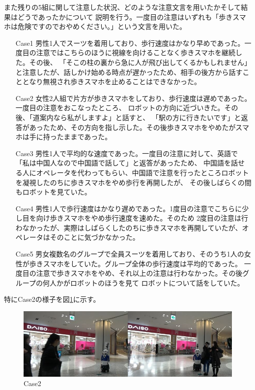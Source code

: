 \documentclass{kuisthesis}
\begin{document}
また残りの5組に関して注意した状況、どのような注意文言を用いたかそして結果はどうであったかについて
説明を行う。一度目の注意はいずれも「歩きスマホは危険ですのでおやめください。」という文言を用いた。
\begin{enumerate}
  \item[Case1] 男性1人でスーツを着用しており、歩行速度はかなり早めであった。一度目の注意ではこちらのほうに視線を向けることなく歩きスマホを継続した。その後、
  「そこの柱の裏から急に人が飛び出してくるかもしれません」
  と注意したが、話しかけ始める時点が遅かったため、相手の後方から話すこととなり無視され歩きスマホを止めることはできなかった。
  \item[Case2] 女性2人組で片方が歩きスマホをしており、歩行速度は遅めであった。一度目の注意をおこなったところ、
  ロボットの方向に近づいきた。その後、「道案内なら私がしますよ」と話すと、
  「駅の方に行きたいです」と返答があったため、その方向を指し示した。その後歩きスマホをやめたがスマホは手に持ったままであった。
  \item[Case3] 男性1人で平均的な速度であった。一度目の注意に対して、英語で「私は中国人なので中国語で話して」と返答があったため、
  中国語を話せる人にオペレータを代わってもらい、中国語で注意を行ったところロボットを凝視したのちに歩きスマホをやめ歩行を再開したが、
  その後しばらくの間もロボットを見ていた。
  \item[Case4] 男性1人で歩行速度はかなり遅めであった。1度目の注意でこちらに少し目を向け歩きスマホをやめ歩行速度を速めた。そのため
  2度目の注意は行わなかったが、実際はしばらくしたのちに歩きスマホを再開していたが、オペレータはそのことに気づかなかった。
  \item[Case5] 男女複数名のグループで全員スーツを着用しており、そのうち1人の女性が歩きスマホをしていた。グループ全体の歩行速度は平均的であった。
  一度目の注意で歩きスマホをやめ、それ以上の注意は行わなかった。その後グループの何人かがロボットのほうを見て
  ロボットについて話をしていた。
\end{enumerate}
特にCase2の様子を図\ref{fig: Case3}に示す。
\begin{figure}[H]
  \centering
  \includegraphics[width=15cm]{img/Case3.jpg}
  \caption{Case2}
  \label{fig: Case3}
\end{figure}
\end{document}
